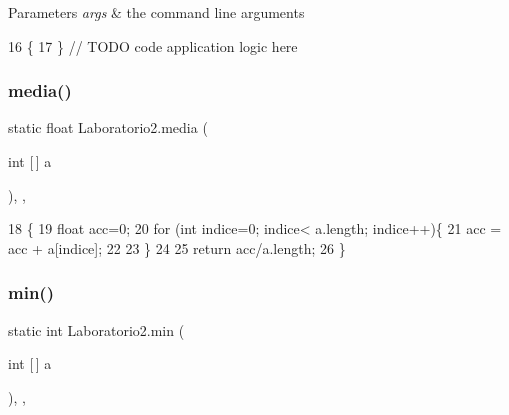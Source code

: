 \begin{DoxyParams}{Parameters}
{\em args} & the command line arguments \\
\hline
\end{DoxyParams}

\begin{DoxyCode}
16                                            \{
17     \}   \textcolor{comment}{// TODO code application logic here}
\end{DoxyCode}
\mbox{\label{class_laboratorio2_a872976e69a5769bc377228a97fc70405}} 
\subsubsection{\texorpdfstring{media()}{media()}}
{\footnotesize\ttfamily static float Laboratorio2.\+media (\begin{DoxyParamCaption}\item[{int \mbox{[}$\,$\mbox{]}}]{a }\end{DoxyParamCaption})\hspace{0.3cm}{\ttfamily [inline]}, {\ttfamily [static]}, {\ttfamily [package]}}


\begin{DoxyCode}
18                                \{   
19         \textcolor{keywordtype}{float} acc=0;
20         \textcolor{keywordflow}{for} (\textcolor{keywordtype}{int} indice=0; indice< a.length; indice++)\{
21             acc = acc + a[indice];
22         
23         \}
24         
25         \textcolor{keywordflow}{return} acc/a.length;
26     \}    
\end{DoxyCode}
\mbox{\label{class_laboratorio2_a1facf757502d39897d554dd5cd9a03fe}} 
\subsubsection{\texorpdfstring{min()}{min()}}
{\footnotesize\ttfamily static int Laboratorio2.\+min (\begin{DoxyParamCaption}\item[{int \mbox{[}$\,$\mbox{]}}]{a }\end{DoxyParamCaption})\hspace{0.3cm}{\ttfamily [inline]}, {\ttfamily [static]}, {\ttfamily [package]}}



